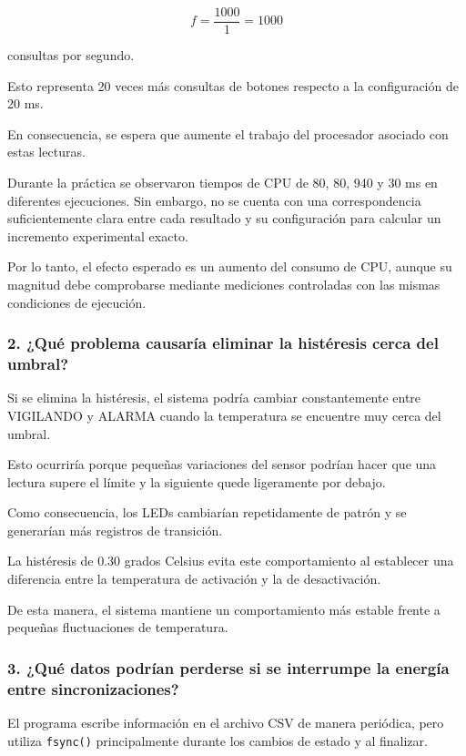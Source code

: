 \documentclass[conference]{IEEEtran}
\begin{document}
\begin{equation}
f = \frac{1000}{1}=1000
\end{equation}

consultas por segundo.

Esto representa 20 veces más consultas de botones respecto a la configuración de 20 ms.

En consecuencia, se espera que aumente el trabajo del procesador asociado con estas lecturas.

Durante la práctica se observaron tiempos de CPU de 80, 80, 940 y 30 ms en diferentes ejecuciones. Sin embargo, no se cuenta con una correspondencia suficientemente clara entre cada resultado y su configuración para calcular un incremento experimental exacto.

Por lo tanto, el efecto esperado es un aumento del consumo de CPU, aunque su magnitud debe comprobarse mediante mediciones controladas con las mismas condiciones de ejecución.

\subsubsection{2. ¿Qué problema causaría eliminar la histéresis cerca del umbral?}

Si se elimina la histéresis, el sistema podría cambiar constantemente entre VIGILANDO y ALARMA cuando la temperatura se encuentre muy cerca del umbral.

Esto ocurriría porque pequeñas variaciones del sensor podrían hacer que una lectura supere el límite y la siguiente quede ligeramente por debajo.

Como consecuencia, los LEDs cambiarían repetidamente de patrón y se generarían más registros de transición.

La histéresis de 0.30 grados Celsius evita este comportamiento al establecer una diferencia entre la temperatura de activación y la de desactivación.

De esta manera, el sistema mantiene un comportamiento más estable frente a pequeñas fluctuaciones de temperatura.

\subsubsection{3. ¿Qué datos podrían perderse si se interrumpe la energía entre sincronizaciones?}

El programa escribe información en el archivo CSV de manera periódica, pero utiliza \texttt{fsync()} principalmente durante los cambios de estado y al finalizar.
\end{document}
